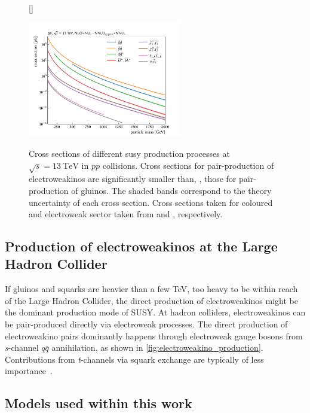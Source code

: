 \begin{figure}
[\FBwidth]
{\caption{Cross sections of different \gls{susy} production processes at $\sqrt{s}=\SI{13}{\TeV}$ in $pp$ collisions. Cross sections for pair-production of electroweakinos are significantly smaller than, \eg, those for pair-production of gluinos. The shaded bands correspond to the theory uncertainty of each cross section. Cross sections taken for coloured and electroweak sector taken from \cite{Beenakker:2016lwe,Beneke:2009ye} and \cite{Fiaschi:2018hgm,Fuks:2012qx,Fiaschi:2018xdm}, respectively.}\label{fig:SUSY_xsecs}}
{\includegraphics[width=0.6\textwidth]{SUSY_xsecs_v1}}
\end{figure}

\subsection{Production of electroweakinos at the Large Hadron Collider}

If gluinos and squarks are heavier than a few TeV, \ie too heavy to be within reach of the Large Hadron Collider, the direct production of electroweakinos might be the dominant production mode of SUSY. At hadron colliders, electroweakinos can be pair-produced directly via electroweak processes. The direct production of electroweakino pairs dominantly happens through electroweak gauge bosons from \textit{s}-channel $q\bar{q}$ annihilation, as shown in \cref{fig:electroweakino_production}. Contributions from \textit{t}-channels via squark exchange are typically of less importance~\cite{Martin:1997ns}.


\subsection{Models used within this work}\label{sec:models_used}

